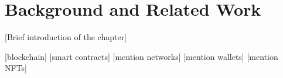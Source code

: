 \chapter{Background and Related Work}
 [Brief introduction of the chapter]




[blockchain]
[smart contracts]
[mention networks]
[mention wallets]
[mention NFTs]
